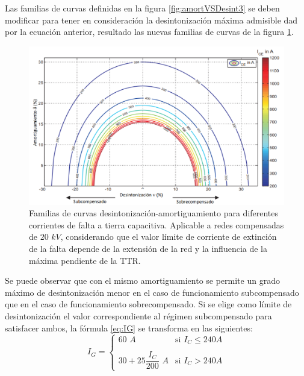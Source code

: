             Las familias de curvas definidas en la figura \ref{fig:amortVSDesint3} se deben modificar para tener en consideración la desintonización máxima admisible dad por la ecuación anterior, resultado las nuevas familias de curvas de la figura \ref{fig:amortVSDesint4}.

            \begin{figure}[H]
                \centering
                \includegraphics[scale=0.3]{capitulos/amortVSDesint4.png}
                \caption{Familias de curvas desintonización-amortiguamiento para diferentes corrientes de falta a tierra capacitiva. Aplicable a redes compensadas de $20\textit{ kV}$, considerando que el valor límite de corriente de extinción de la falta depende de la extensión de la red y la influencia de la máxima pendiente de la TTR.}
                \label{fig:amortVSDesint4}
            \end{figure}

            Se puede observar que con el mismo amortiguamiento se permite un grado máximo de desintonización menor en el caso de funcionamiento subcompensado que en el caso de funcionamiento sobrecompensado. Si se elige como límite de desintonización el valor correspondiente al régimen subcompensado para satisfacer ambos, la fórmula \eqref{eq:IG} se transforma en las siguientes:
            \begin{equation}
                I_\textit{G} = \left\{
                    \begin{matrix}
                        60\textit{ A} & \text{si }I_\textit{C} \leq 240\textit{A}\\
                        \\
                        30+25\dfrac{I_\textit{C}}{200}\textit{ A} & \text{si }I_\textit{C} > 240\textit{A}
                    \end{matrix}
                \right.
            \end{equation}

